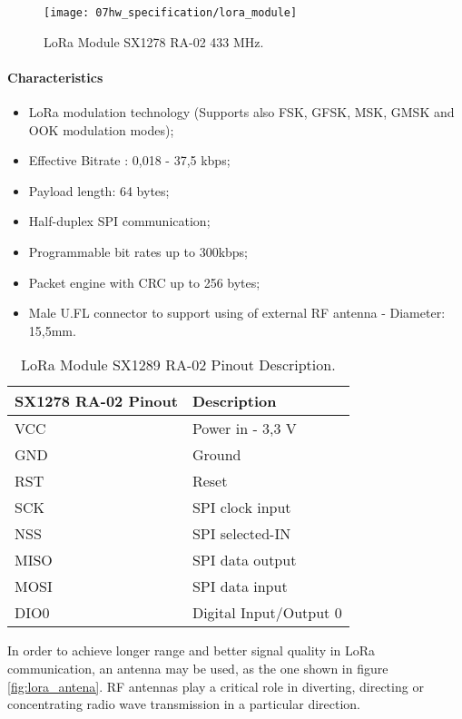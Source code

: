 \begin{figure}[H]
	\centering
	\texttt{[image: 07hw\_specification/lora\_module]}
	\caption{LoRa Module SX1278 RA-02 433 MHz.}
	\label{fig:lora_module}
\end{figure}

\paragraph*{Characteristics}
\begin{itemize}
	\item LoRa modulation technology (Supports also FSK, GFSK, MSK, GMSK and OOK modulation modes);
	\item Effective Bitrate : 0,018 - 37,5 kbps;
	\item Payload length: 64 bytes;
	\item Half-duplex SPI communication;
	\item Programmable bit rates up to 300kbps;
	\item Packet engine with CRC up to 256 bytes;
	\item Male U.FL connector to support using of external RF antenna - Diameter: 15,5mm.
\end{itemize}

\begin{table}[H]
	\centering
		\begin{tabular}{|m{5cm}|m{6cm}|}
			\hline
			\textbf{SX1278 RA-02 Pinout} & \textbf{Description}
			\\\hline\hline
		
			VCC & Power in - 3,3 V\\\hline
			GND & Ground\\\hline
			RST & Reset \\\hline
			SCK & SPI clock input\\\hline
			NSS & SPI selected-IN\\\hline
			MISO & SPI data output\\\hline
			MOSI & SPI data input\\\hline
			DIO0 & Digital Input/Output 0\\\hline
		\end{tabular}
	
	\caption{LoRa Module SX1289 RA-02 Pinout Description.}
	\label{table:lora_module_pinout}
\end{table}

In order to achieve longer range and better signal quality in LoRa communication, an antenna may be used, as the one shown in figure \ref{fig:lora_antena}. RF antennas play a critical role in diverting, directing or concentrating radio wave transmission in a particular direction. 

